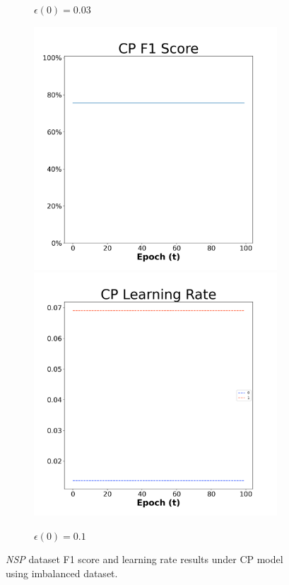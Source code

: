 \begin{figure}[H]
\begin{subfigure}{0.3\textwidth}
\caption{$\epsilon(0)=0.03$}
\end{subfigure}\hfil %
\begin{subfigure}{0.3\textwidth}
\includegraphics[width=\linewidth]{images/exper2/NSP/CP_0.1_f1.png}
\includegraphics[width=\linewidth]{images/exper2/NSP/CP_0.1_lr.png}
\caption{$\epsilon(0)=0.1$}
\end{subfigure}

\caption{\textit{NSP} dataset F1 score and learning rate results under CP model using imbalanced dataset.}
\end{figure}

